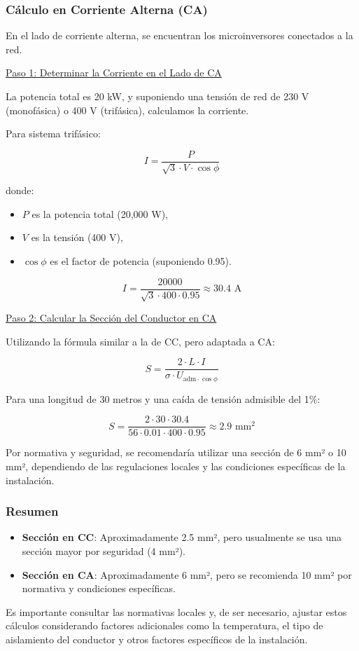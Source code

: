 \documentclass[a4paper,12pt]{article}
\begin{document}
\begin{Form}
\subsubsection{Cálculo en Corriente Alterna (CA)}

En el lado de corriente alterna, se encuentran los microinversores conectados a la red.

\uline{Paso 1: Determinar la Corriente en el Lado de CA}

La potencia total es 20 kW, y suponiendo una tensión de red de 230 V (monofásica) o 400 V (trifásica), calculamos la corriente.

Para sistema trifásico:

$$
I = \frac{P}{\sqrt{3} \cdot V \cdot \cos\phi}
$$

donde:
\begin{itemize}
    \item \(P\) es la potencia total (20,000 W),
    \item \(V\) es la tensión (400 V),
    \item \(\cos\phi\) es el factor de potencia (suponiendo 0.95).
\end{itemize}

$$
I = \frac{20000}{\sqrt{3} \cdot 400 \cdot 0.95} \approx 30.4 \text{ A}
$$

\uline{Paso 2: Calcular la Sección del Conductor en CA}

Utilizando la fórmula similar a la de CC, pero adaptada a CA:

$$
S = \frac{2 \cdot L \cdot I}{\sigma \cdot U_{\text{adm} \cdot \cos\phi}}
$$

Para una longitud de 30 metros y una caída de tensión admisible del 1\%:

$$
S = \frac{2 \cdot 30 \cdot 30.4}{56 \cdot 0.01 \cdot 400 \cdot 0.95} \approx 2.9 \text{ mm}^2
$$

Por normativa y seguridad, se recomendaría utilizar una sección de 6 mm² o 10 mm², dependiendo de las regulaciones locales y las condiciones específicas de la instalación.

\subsubsection{Resumen}

\begin{itemize}
    \item \textbf{Sección en CC}: Aproximadamente 2.5 mm², pero usualmente se usa una sección mayor por seguridad (4 mm²).
    \item \textbf{Sección en CA}: Aproximadamente 6 mm², pero se recomienda 10 mm² por normativa y condiciones específicas.
\end{itemize}

Es importante consultar las normativas locales y, de ser necesario, ajustar estos cálculos considerando factores adicionales como la temperatura, el tipo de aislamiento del conductor y otros factores específicos de la instalación.



\end{Form}
\end{document}
